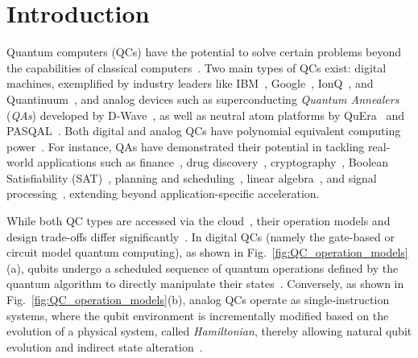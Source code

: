 


\section{Introduction}

Quantum computers (QCs) have the potential to solve certain problems beyond the capabilities of classical computers~\cite{arute2019quantum,villalonga2020establishing,preskillNISQ,king2021scaling,wu2021strong}. %
Two main types of QCs exist: %
digital machines, exemplified by industry leaders like IBM~\cite{IBMQ}, Google~\cite{GoogleAI}, IonQ~\cite{IonQ}, and Quantinuum~\cite{quantinuum},  
and analog devices such as superconducting \emph{Quantum Annealers} (\emph{QAs}) developed by D-Wave~\cite{D-Wave}, as well as neutral atom platforms by QuEra~\cite{QuEra} and PASQAL~\cite{PASQAL}. 
Both digital and analog QCs have polynomial equivalent computing power~\cite{aharonov2008adiabatic,albash2018adiabatic}.
For instance, QAs have demonstrated their potential in tackling real-world applications such as finance~\cite{elsokkary2017financial}, drug discovery~\cite{mulligan2020designing}, cryptography~\cite{peng2019factoring,hu2020quantum}, Boolean Satisfiability (SAT)~\cite{su2016quantum,ayanzadeh2020reinforcement,ayanzadeh2018solving,ayanzadeh2019sat}, planning and scheduling~\cite{inoue2021traffic,rieffel2015case,venturelli2015quantum,tran2016hybrid}, linear algebra~\cite{o2018nonnegative}, and signal processing~\cite{ayanzadeh2019quantum,ayanzadeh2020ensemble}, 
extending beyond application-specific acceleration.


While both QC types are accessed via the cloud~\cite{AmazonBraKet,MicrosoftAzure,D-Wave}, their operation models and design trade-offs differ significantly~\cite{ayanzadeh2022equal}.
In digital QCs (namely the gate-based or circuit model quantum computing), as shown in Fig.~\ref{fig:QC_operation_models}(a), qubits undergo a scheduled sequence of quantum operations defined by the quantum algorithm to directly manipulate their states~\cite{nielsen2010quantum}.
Conversely, as shown in Fig.~\ref{fig:QC_operation_models}(b), analog QCs operate as single-instruction systems, where the qubit environment is incrementally modified based on the evolution of a physical system, called \emph{Hamiltonian}, thereby allowing natural qubit evolution and indirect state alteration~\cite{ayanzadeh2022equal,albash2018adiabatic,mcgeoch2020theory}.



